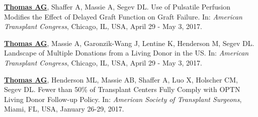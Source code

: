 \documentclass[10pt]{article}
\makeatletter
\newlength{\bibhang}
\newlength{\bibsep}
 {\@listi \global\bibsep\itemsep \global\advance\bibsep by\parsep}
\newenvironment{bibenum*}
  {\renewcommand\labelenumi{[\theenumi]}%
   \etaremune[
     topsep=0pt,
     itemsep=\bibsep,
     parsep=0pt,partopsep=0pt,
     itemindent=-\bibhang,
     leftmargin={\bibhang+\widthof{[999]}}]}
  {\endetaremune}
\makeatother
\begin{document}
\begin{bibenum*}

\item \underline{\textbf{Thomas AG}}, Shaffer A, Massie A, Segev DL.
  Use of Pulsatile Perfusion Modifies the Effect of
  Delayed Graft Function on Graft Failure.
  In: \emph{American Transplant Congress},
  Chicago, IL, USA, April 29 - May 3, 2017.

\item \underline{\textbf{Thomas AG}}, Massie A, Garonzik-Wang J,
  Lentine K, Henderson M, Segev DL.
  Landscape of Multiple Donations from a Living Donor in the US.
  In: \emph{American Transplant Congress},
  Chicago, IL, USA, April 29 - May 3, 2017.




\item \underline{\textbf{Thomas AG}}, Henderson ML, Massie AB, Shaffer A,
  Luo X, Holscher CM, Segev DL. Fewer than 50\% of Transplant Centers Fully
  Comply with OPTN Living Donor Follow-up Policy.
  In: \emph{American Society of Transplant Surgeons},
  Miami, FL, USA, January 26-29, 2017.



\end{bibenum*}
\end{document}
